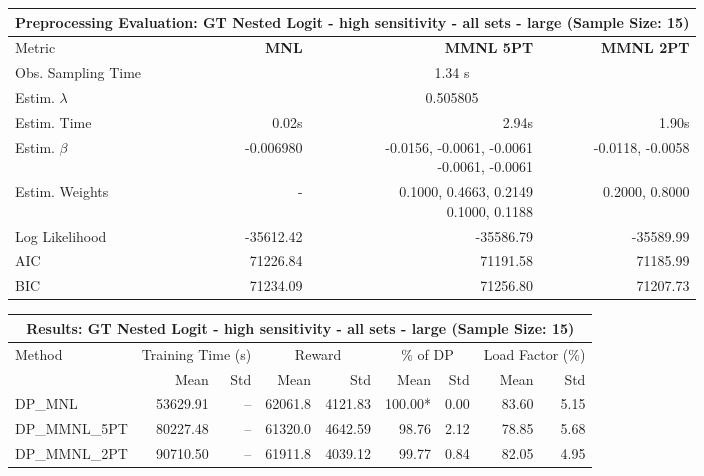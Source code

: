 
\begin{samepage}
\begin{center}
  \small
  \begin{tabular}{l|r|r|r}
    \toprule
    \multicolumn{4}{c}{\textbf{Preprocessing Evaluation: GT Nested Logit - high sensitivity - all sets - large (Sample Size: 15)}} \\
    \midrule
    Metric & \textbf{MNL} & \textbf{MMNL 5PT} & \textbf{MMNL 2PT} \\
    \midrule
    Obs. Sampling Time & \multicolumn{3}{c}{1.34 s} \\
    Estim. $\lambda$ & \multicolumn{3}{c}{0.505805} \\
    Estim. Time & 0.02s & 2.94s & 1.90s \\
    Estim. $\beta$ & -0.006980 & \makecell[tr]{-0.0156, -0.0061, -0.0061 \\ -0.0061, -0.0061} & -0.0118, -0.0058 \\
    Estim. Weights & - & \makecell[tr]{0.1000, 0.4663, 0.2149 \\ 0.1000, 0.1188} & 0.2000, 0.8000 \\
    Log Likelihood & -35612.42 & -35586.79 & -35589.99 \\
    AIC & 71226.84 & 71191.58 & 71185.99 \\
    BIC & 71234.09 & 71256.80 & 71207.73 \\
    \bottomrule
  \end{tabular}
\end{center}
\begin{center}
  \small
  \begin{tabular}{l|rr|rr|rr|rr}
    \toprule
    \multicolumn{9}{c}{\textbf{Results: GT Nested Logit - high sensitivity - all sets - large (Sample Size: 15)}} \\
    \midrule
    Method & \multicolumn{2}{c|}{Training Time (s)} & \multicolumn{2}{c|}{Reward} & \multicolumn{2}{c|}{\% of DP} & \multicolumn{2}{c}{Load Factor (\%)} \\
    & Mean & Std & Mean & Std & Mean & Std & Mean & Std \\
    \midrule
    DP\_MNL      & 53629.91 &    -- &    62061.8 &    4121.83 & 100.00* &    0.00 &   83.60 &    5.15 \\
    DP\_MMNL\_5PT & 80227.48 &    -- &    61320.0 &    4642.59 &   98.76 &    2.12 &   78.85 &    5.68 \\
    DP\_MMNL\_2PT & 90710.50 &    -- &    61911.8 &    4039.12 &   99.77 &    0.84 &   82.05 &    4.95 \\

\end{tabular}
\end{center}
\end{samepage}
